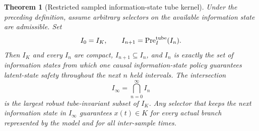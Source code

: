 \documentclass[11pt]{article}
\newtheorem{theorem}{Theorem}
\theoremstyle{definition}
\newcommand{\Pre}{\operatorname{Pre}}
\begin{document}
\begin{theorem}[Restricted sampled information-state tube kernel]
\label{thm:information-viability}
Under the preceding definition, assume arbitrary selectors on the available information state are admissible. Set
\[
I_0=I_K,
\qquad
I_{n+1}=\Pre_I^{\rm tube}(I_n).
\]
Then $I_K$ and every $I_n$ are compact, $I_{n+1}\subseteq I_n$, and $I_n$ is exactly the set of information states from which one causal information-state policy guarantees latent-state safety throughout the next $n$ held intervals. The intersection
\begin{equation}
I_\infty=\bigcap_{n=0}^{\infty}I_n
\label{eq:information-kernel}
\end{equation}
is the largest robust tube-invariant subset of $I_K$. Any selector that keeps the next information state in $I_\infty$ guarantees $x(t)\in K$ for every actual branch represented by the model and for all inter-sample times.
\end{theorem}
\end{document}
